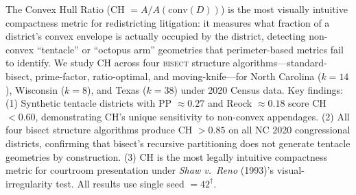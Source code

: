 The Convex Hull Ratio (CH $= A / A(\text{conv}(D))$) is the most visually
intuitive compactness metric for redistricting litigation: it measures what
fraction of a district's convex envelope is actually occupied by the district,
detecting non-convex ``tentacle'' or ``octopus arm'' geometries that perimeter-based
metrics fail to identify.
We study CH across four \textsc{bisect} structure algorithms---standard-bisect,
prime-factor, ratio-optimal, and moving-knife---for North Carolina ($k=14$),
Wisconsin ($k=8$), and Texas ($k=38$) under 2020 Census data.
Key findings: (1) Synthetic tentacle districts with PP $\approx 0.27$
and Reock $\approx 0.18$ score CH $< 0.60$, demonstrating CH's unique
sensitivity to non-convex appendages.
(2) All four bisect structure algorithms produce CH $> 0.85$ on all NC 2020
congressional districts, confirming that bisect's recursive partitioning
does not generate tentacle geometries by construction.
(3) CH is the most legally intuitive compactness metric for courtroom
presentation under \textit{Shaw v.\ Reno} (1993)'s visual-irregularity test.
All results use single seed $= 42^\dagger$.
